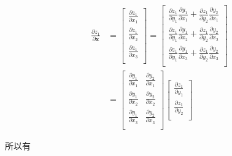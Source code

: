 \documentclass[lang=cn,newtx,10pt,scheme=chinese]{elegantbook}
\begin{document}
\begin{equation*}
  \begin{aligned}
    \frac{\partial z_1}{\partial \mathbf{x}} &= 
    \begin{bmatrix}
    \frac{\partial z_1}{\partial x_1} \\
    \frac{\partial z_1}{\partial x_2} \\
    \frac{\partial z_1}{\partial x_3} \\
    \end{bmatrix}
    =
    \begin{bmatrix}
      \frac{\partial z_1}{\partial y_1}\frac{\partial y_1}{\partial x_1}+\frac{\partial z_1}{\partial y_2}\frac{\partial y_2}{\partial x_1} \\
      \frac{\partial z_1}{\partial y_1}\frac{\partial y_1}{\partial x_2}+\frac{\partial z_1}{\partial y_2}\frac{\partial y_2}{\partial x_2} \\
      \frac{\partial z_1}{\partial y_1}\frac{\partial y_1}{\partial x_3}+\frac{\partial z_1}{\partial y_2}\frac{\partial y_2}{\partial x_3} \\
    \end{bmatrix} \\
    &=
    \begin{bmatrix}
      \frac{\partial y_1}{\partial x_1} & \frac{\partial y_2}{\partial x_1} \\
      \frac{\partial y_1}{\partial x_2} & \frac{\partial y_2}{\partial x_2} \\
      \frac{\partial y_1}{\partial x_3} & \frac{\partial y_2}{\partial x_3} \\
    \end{bmatrix}
    \begin{bmatrix}
      \frac{\partial z_1}{\partial y_1} \\
      \frac{\partial z_1}{\partial y_2} \\
    \end{bmatrix}
  \end{aligned}
\end{equation*}

所以有
\end{document}
